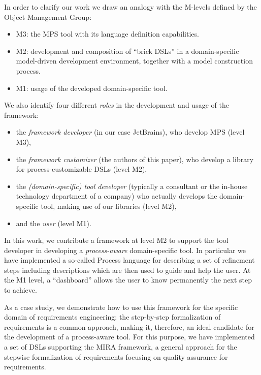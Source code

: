 In order to clarify our work we draw an analogy with the M-levels defined by the Object Management Group:
\vspace{-.1cm}
\begin{itemize}
  \item M3: the MPS tool with its language definition capabilities.
  \item M2: development and composition of ``brick DSLs'' in a
  domain-specific model-driven development environment, together with a
  model construction process.
  \item M1: usage of the developed domain-specific tool.
\end{itemize}
We also identify four different \emph{roles} in the development and
usage of the framework:
\vspace{-.1cm}
\begin{itemize}
  \item the \emph{framework developer} (in our case JetBrains), who develop MPS
  (level M3),
  \item the \emph{framework customizer} (the authors of this paper), who develop
  a library for process-customizable DSLs (level M2),
  \item the \emph{(domain-specific) tool developer} 
    (typically a consultant or the in-house technology department of a company)
    who actually develops the domain-specific tool, making use of our libraries (level M2),
  \item and the \emph{user} (level M1).
\end{itemize}
\vspace{-.1cm}
In this work, we contribute a framework at level M2 to support the tool developer
in developing a \emph{process-aware} domain-specific tool.
In particular we have implemented a so-called \textsf{Process} language for
describing a set of refinement steps including descriptions which are then used to guide and help the user.
At the M1 level, a ``dashboard'' allows the user to know permanently the next step to achieve.

As a case study, we demonstrate how to use this framework for the
specific domain of requirements engineering: the step-by-step formalization of requirements is a common approach,
making it, therefore, an ideal candidate for the development of a process-aware tool.
For this purpose, we have implemented a set of DSLs supporting the MIRA
\cite{MIRA13} framework, a general approach for the stepwise formalization of requirements
focusing on quality assurance for requirements.

